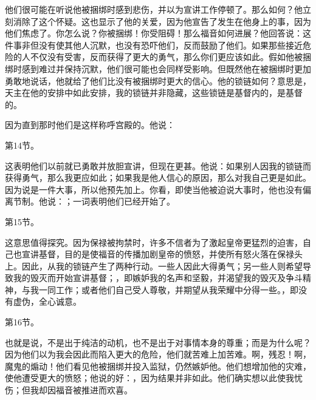 他们很可能在听说他被捆绑时感到悲伤，并以为宣讲工作停顿了。那么如何？他立刻消除了这个怀疑。这也显示了他的关爱，因为他宣告了发生在他身上的事，因为他们焦虑了。你怎么说？你被捆绑！你受阻碍！那么福音如何进展？他回答说：这件事非但没有使其他人沉默，也没有恐吓他们，反而鼓励了他们。如果那些接近危险的人不仅没有受害，反而获得了更大的勇气，那么你们更应该如此。假如他被捆绑时感到难过并保持沉默，他们很可能也会同样受影响。但既然他在被捆绑时更加勇敢地说话，他就给了他们比没有被捆绑时更大的信心。他的锁链如何？意思是，天主在他的安排中如此安排，我的锁链并非隐藏，这些锁链是基督内的，是基督的。\par

因为直到那时他们是这样称呼宫殿的。他说：\par

第14节。\par

这表明他们以前就已勇敢并放胆宣讲，但现在更甚。他说：如果别人因我的锁链而获得勇气，那么我更应如此；如果我是他人信心的原因，那么对我自己更是如此。因为说是一件大事，所以他预先加上。你看，即使当他被迫说大事时，他也没有偏离节制。他说：；一词表明他们已经开始了。\par

第15节。\par

这意思值得探究。因为保禄被拘禁时，许多不信者为了激起皇帝更猛烈的迫害，自己也宣讲基督，目的是使福音的传播加剧皇帝的愤怒，并使所有怒火落在保禄头上。因此，从我的锁链产生了两种行动。一些人因此大得勇气；另一些人则希望导致我的毁灭而开始宣讲基督；，即嫉妒我的名声和坚毅，并渴望我的毁灭及争斗精神，与我一同工作；或者他们自己受人尊敬，并期望从我荣耀中分得一些。，即没有虚伪，全心诚意。\par

第16节。\par

也就是说，不是出于纯洁的动机，也不是出于对事情本身的尊重；而是为什么呢？因为他们以为我会因此而陷入更大的危险，他们就苦难上加苦难。啊，残忍！啊，魔鬼的煽动！他们看见他被捆绑并投入监狱，仍然嫉妒他。他们想增加他的灾难，使他遭受更大的愤怒；他说的好：，因为结果并非如此。他们确实想以此使我忧伤；但我却因福音被推进而欢喜。\par


